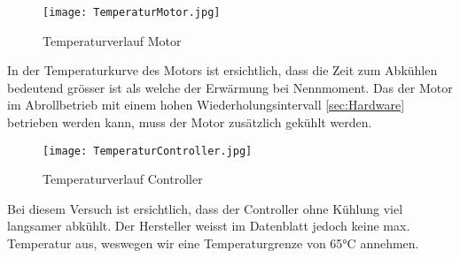 \begin{figure}[H]
	\centering
	\texttt{[image: TemperaturMotor.jpg]}
	\caption{Temperaturverlauf Motor}\label{fig:TemperaturMotor}
\end{figure}

In der Temperaturkurve des Motors ist ersichtlich, dass die Zeit zum Abkühlen bedeutend grösser ist als welche der Erwärmung bei Nennmoment. Das der Motor im Abrollbetrieb mit einem hohen Wiederholungsintervall \ref{sec:Hardware} betrieben werden kann, muss der Motor zusätzlich gekühlt werden.

\begin{figure}[H]
	\centering
	\texttt{[image: TemperaturController.jpg]}
	\caption{Temperaturverlauf Controller}\label{fig:TemperaturController}
\end{figure}

Bei diesem Versuch ist ersichtlich, dass der Controller ohne Kühlung viel langsamer abkühlt. Der Hersteller weisst im Datenblatt jedoch keine max. Temperatur \cite{ControllerUserGuide} aus, weswegen wir eine Temperaturgrenze von 65°C annehmen.